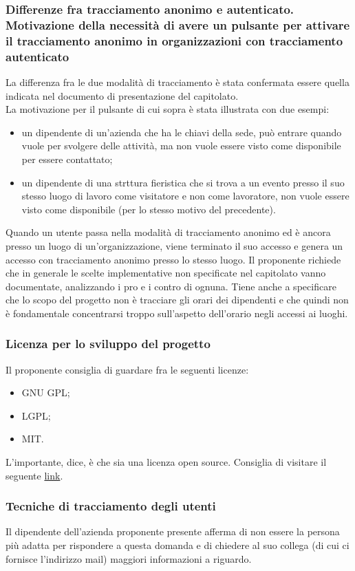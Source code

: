 \subsubsection*{Differenze fra tracciamento anonimo e autenticato. Motivazione della necessità di avere un pulsante per attivare il tracciamento anonimo in organizzazioni con tracciamento autenticato}
La differenza fra le due modalità di tracciamento è stata confermata essere quella indicata nel documento di presentazione del capitolato.\\
La motivazione per il pulsante di cui sopra è stata illustrata con due esempi:
\begin{itemize}
	\item un dipendente di un'azienda che ha le chiavi della sede, può entrare quando vuole per svolgere delle attività, ma non vuole essere visto come disponibile per essere contattato;
	\item un dipendente di una strttura fieristica che si trova a un evento presso il suo stesso luogo di lavoro come visitatore e non come lavoratore, non vuole essere visto come disponibile (per lo stesso motivo del precedente).
\end{itemize}
Quando un utente passa nella modalità di tracciamento anonimo ed è ancora presso un luogo di un'organizzazione, viene terminato il suo accesso e genera un accesso con tracciamento anonimo presso lo stesso luogo.
Il proponente richiede che in generale le scelte implementative non specificate nel capitolato vanno documentate, analizzando i pro e i contro di ognuna. Tiene anche a specificare che lo scopo del progetto non è
tracciare gli orari dei dipendenti e che quindi non è fondamentale concentrarsi troppo sull'aspetto dell'orario negli accessi ai luoghi.

\subsubsection*{Licenza per lo sviluppo del progetto}
Il proponente consiglia di guardare fra le seguenti licenze:
\begin{itemize}
	\item GNU GPL;
	\item LGPL;
	\item MIT.
\end{itemize}
L'importante, dice, è che sia una licenza open source. Consiglia di visitare il seguente \href{https://opensource.org/licenses}{link}.

\subsubsection*{Tecniche di tracciamento degli utenti}
Il dipendente dell'azienda proponente presente afferma di non essere la persona più adatta per rispondere a questa domanda e di chiedere al suo collega (di cui ci fornisce l'indirizzo mail) maggiori informazioni a riguardo.

